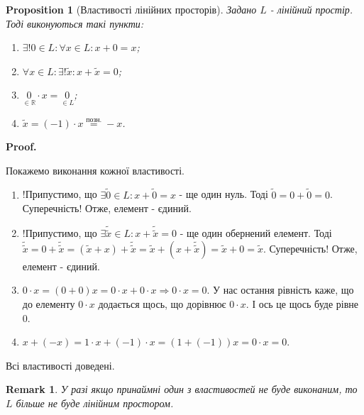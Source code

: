 \documentclass[a4paper, 10pt]{article}
\makeatletter
\theoremstyle{theoremdd}
\newtheorem{proposition}[theorem]{Proposition}
\newtheorem{remark}[theorem]{Remark}
\renewenvironment{proof}[1][Proof.\\]{\par
\pushQED{\hfill \qed}%
\normalfont \topsep6\p@\@plus6\p@\relax
\trivlist
\item\relax
{\bfseries
#1\@addpunct{.}}\hspace\labelsep\ignorespaces
}{%
\popQED\endtrivlist\@endpefalse
}
\makeatother
\begin{document}
	\begin{proposition}[Властивості лінійних просторів]
	Задано $L$ - лінійний простір. Тоді виконуються такі пункти:
	\begin{enumerate}[nosep, wide=0pt, label={\arabic*)}]	
	\item $\exists !0 \in L: \forall x \in L: x + 0 = x$;
	\item $\forall x \in L: \exists! \tilde{x}: x + \tilde{x} = 0$;
	\item $\underset{\in \mathbb{R}}{0} \cdot x = \underset{\in L}{0}$;
	\item $\tilde{x} = (-1) \cdot x \overset{\text{позн.}}{=} -x$.
	\end{enumerate}
	\end{proposition}
	
	\begin{proof}
	Покажемо виконання кожної властивості.
	\begin{enumerate}[topsep=-\parskip, wide=0pt, label={\arabic*)}]
	\item !Припустимо, що $\exists \tilde{0} \in L: x + \tilde{0} = x$ - ще один нуль. Тоді $\tilde{0} = 0 + \tilde{0} = 0$. Суперечність! Отже, елемент - єдиний.
	\item !Припустимо, що $\exists \tilde{\tilde{x}} \in L: x + \tilde{\tilde{x}} = 0$ - ще один обернений елемент. Тоді $\tilde{\tilde{x}} = 0 + \tilde{\tilde{x}} = (\tilde{x} + x) + \tilde{\tilde{x}} = \tilde{x} + (x + \tilde{\tilde{x}}) = \tilde{x} + 0 = \tilde{x}$. Суперечність! Отже, елемент - єдиний.
	\item $0 \cdot x = (0 + 0)x = 0\cdot x + 0 \cdot x \Rightarrow 0 \cdot x = 0$. У нас остання рівність каже, що до елементу $0 \cdot x$ додається щось, що дорівнює $0 \cdot x$. І ось це щось буде рівне $0$.
	\item $x + (-x) = 1 \cdot x + (-1) \cdot x = (1 + (-1))x = 0 \cdot x = 0$.
	\end{enumerate}
	Всі властивості доведені.
	\end{proof}
	
	\begin{remark}
	У разі якщо принаймні один з властивостей не буде виконаним, то $L$ більше не буде лінійним простором.
	\end{remark}
	
\end{document}
